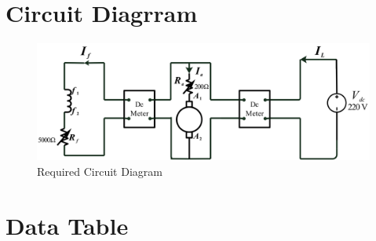 \documentclass[a4paper,12pt]{article}
\begin{document}
	\section{Circuit Diagrram}
	\begin{figure}[H]
		\centering
		\includegraphics[width=1.1\textwidth]{Images/dcmotor}
		\caption{Required Circuit Diagram}
		
	\end{figure}
	
	
	
	
	
	\newpage
	\section{Data Table}
\end{document}
